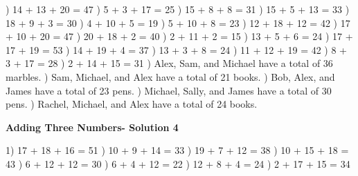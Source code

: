 \documentclass{article}%
\begin{document}
) 14 + 13 + 20 = 47%
) 5 + 3 + 17 = 25%
) 15 + 8 + 8 = 31%
) 15 + 5 + 13 = 33%
) 18 + 9 + 3 = 30%
) 4 + 10 + 5 = 19%
) 5 + 10 + 8 = 23%
) 12 + 18 + 12 = 42%
) 17 + 10 + 20 = 47%
) 20 + 18 + 2 = 40%
) 2 + 11 + 2 = 15%
) 13 + 5 + 6 = 24%
) 17 + 17 + 19 = 53%
) 14 + 19 + 4 = 37%
) 13 + 3 + 8 = 24%
) 11 + 12 + 19 = 42%
) 8 + 3 + 17 = 28%
) 2 + 14 + 15 = 31%
) Alex, Sam, and Michael have a total of 36 marbles.%
) Sam, Michael, and Alex have a total of 21 books.%
) Bob, Alex, and James have a total of 23 pens.%
) Michael, Sally, and James have a total of 30 pens.%
) Rachel, Michael, and Alex have a total of 24 books.%
\newline%
\newpage%
\large%
\begin{center}%
\textbf{Adding Three Numbers- Solution 4}%
\newline%
\end{center} \normalsize%
1) 17 + 18 + 16 = 51%
) 10 + 9 + 14 = 33%
) 19 + 7 + 12 = 38%
) 10 + 15 + 18 = 43%
) 6 + 12 + 12 = 30%
) 6 + 4 + 12 = 22%
) 12 + 8 + 4 = 24%
) 2 + 17 + 15 = 34%
\end{document}
